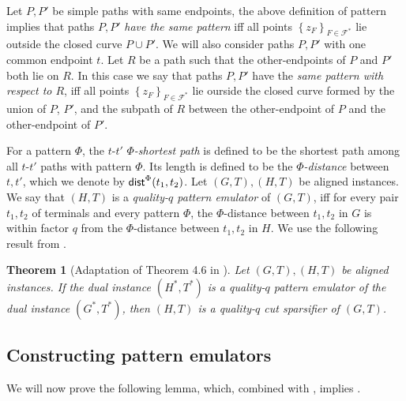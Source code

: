 \documentclass[11pt]{article}
\newtheorem{theorem}{Theorem}
\newtheorem{observation}[theorem]{Observation}
\theoremstyle{definition}
\newcommand{\set}[1]{\left\{ #1 \right\}}
\newcommand{\fset}{{\mathcal{F}}}
\newcommand{\dist}{\textnormal{\textsf{dist}}}
\newcounter{note}
\newcommand{\pat}{\Phi}
\begin{document}
Let $P,P'$ be simple paths with same endpoints, the above definition of pattern implies that paths $P,P'$ \emph{have the same pattern} iff all points $\set{z_F}_{F\in \fset^*}$ lie outside the closed curve $P\cup P'$.
We will also consider paths $P,P'$ with one common endpoint $t$. Let $R$ be a path such that the other-endpoints of $P$ and $P'$ both lie on $R$. In this case we say that paths $P,P'$ have the \emph{same pattern with respect to $R$}, iff all points $\set{z_F}_{F\in \fset^*}$ lie ourside the closed curve formed by the union of $P$, $P'$, and the subpath of $R$ between the other-endpoint of $P$ and the other-endpoint of $P'$.

For a pattern $\pat$, the $t$-$t'$ \emph{$\pat$-shortest path} is defined to be the shortest path among all $t$-$t'$ paths with pattern $\pat$. Its length is defined to be the \emph{$\pat$-distance} between $t,t'$, which we denote by $\dist^{\Phi}(t_1,t_2)$.
Let $(G,T), (H,T)$ be aligned instances. We say that $(H,T)$ is a \emph{quality-$q$ pattern emulator} of $(G,T)$, iff for every pair $t_1,t_2$ of terminals and every pattern $\pat$, the $\pat$-distance between $t_1,t_2$ in $G$ is within factor $q$ from the $\pat$-distance between $t_1,t_2$ in $H$.
We use the following result from \cite{krauthgamer2017refined}.

\begin{theorem}[Adaptation of Theorem 4.6 in \cite{krauthgamer2017refined}]
\label{thm: pattern for cut}
Let $(G,T),(H,T)$ be aligned instances. If the dual instance $(H^*,T^*)$ is a quality-$q$ pattern emulator of the dual instance $(G^*,T^*)$, then $(H,T)$ is a quality-$q$ cut sparsifier of $(G,T)$.
\end{theorem}




\subsection{Constructing pattern emulators}

We will now prove the following lemma, which, combined with , implies .
\end{document}
